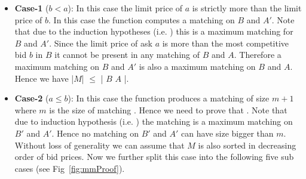 \documentclass[a4paper,UKenglish,cleveref, autoref]{lipics-v2019}
\begin{document}
\begin{itemize}
\item \textbf{Case-1} ($b<a$): In this case the limit price of $a$ is strictly more than the limit price of $b$.  In this case the function  computes a matching on $B$ and $A'$. Note that due to the induction hypotheses (i.e. ) this is a maximum matching for $B$ and $A'$. Since the limit price of ask $a$ is more than the most competitive bid $b$ in $B$ it cannot be present in any matching of $B$ and $A$. Therefore a maximum matching on $B$ and $A'$ is also a maximum matching on $B$ and $A$. Hence we have |$M$| $\leq$ |  $B$ $A$ |.
\item \textbf{Case-2} ($a \leq b$): In this case the function  produces a matching of size $m + 1$ where $m$ is the size of matching .  Hence we need to prove that . Note that due to induction hypothesis (i.e. ) the matching  is a maximum matching on $B'$ and $A'$.  Hence no matching on $B'$ and $A'$ can have size bigger than $m$. Without loss of generality we can assume that $M$ is also sorted in decreasing order of bid prices. Now we further split this case into the following five sub cases (see Fig~\ref{fig:mmProof}).


\end{itemize}
\end{document}
